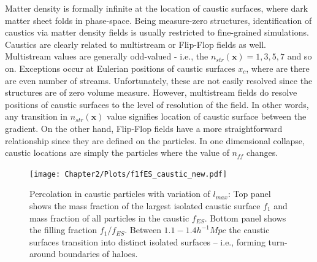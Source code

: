 
Matter density is formally infinite at the location of caustic surfaces, where dark matter sheet folds in phase-space. Being measure-zero structures, identification of caustics via matter density fields is usually restricted to fine-grained simulations. Caustics are clearly related to multistream or Flip-Flop fields as well. Multistream values are generally odd-valued - i.e., the $n_{str}(\mathbf{x}) = 1, 3, 5, 7$  and so on. Exceptions occur at Eulerian positions of caustic surfaces $x_c$, where are there are even number of streams. Unfortunately, these are not easily resolved since the structures are of zero volume measure. However, multistream fields do resolve positions of caustic surfaces to the level of resolution of the field. In other words, any transition in $n_{str}(\mathbf{x})$ value signifies location of caustic surface between the gradient. On the other hand, Flip-Flop fields have a more straightforward relationship since they are defined on the particles. In one dimensional collapse, caustic locations are simply the particles where the value of $n_{ff}$ changes. 

\begin{figure} 
\centering\texttt{[image: Chapter2/Plots/f1fES\_caustic\_new.pdf]} 
\caption{Percolation in caustic particles with variation of $l_{max}$: Top panel shows the mass fraction of the largest isolated caustic surface $f_1$ and mass fraction of all particles in the caustic $f_{ES}$. Bottom panel shows the filling fraction $f_1/f_{ES}$. Between $1.1-1.4 h^{-1} Mpc$ the caustic surfaces transition into distinct isolated surfaces -- i.e., forming turn-around boundaries of haloes. }
\label{fig:caustic_perc_lmax}
\end{figure}

